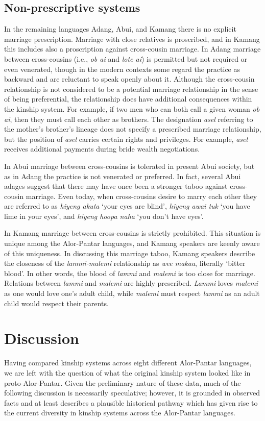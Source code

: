 \subsection{Non-prescriptive systems}
In the remaining languages Adang, Abui, and Kamang there is no explicit marriage prescription. Marriage with close relatives is proscribed, and in Kamang this includes also a proscription against cross-cousin marriage. In Adang marriage between cross-cousins (i.e., \textit{ob ai} and \textit{lote ai}) is permitted but not required or even venerated, though in the modern contexts some regard the practice as backward and are reluctant to speak openly about it. Although the cross-cousin relationship is not considered to be a potential marriage relationship in the sense of being preferential, the relationship does have additional consequences within the kinship system. For example, if two men who can both call a given woman \textit{ob ai}, then they must call each other as brothers. The designation \textit{asel} referring to the mother's brother's lineage does not specify a prescribed marriage relationship, but the position of \textit{asel} carries certain rights and privileges. For example, \textit{asel} receives additional payments during bride wealth negotiations.

In Abui marriage between cross-cousins is tolerated in present Abui society, but as in Adang the practice is not venerated or preferred. In fact, several Abui adages suggest that there may have once been a stronger taboo against cross-cousin marriage. Even today, when cross-cousins desire to marry each other they are referred to as \textit{hiyeng akuta} `your eyes are blind', \textit{hiyeng awai tuk} `you have lime in your eyes', and \textit{hiyeng hoopa naha} `you don't have eyes'.

In Kamang marriage between cross-cousins is strictly prohibited. This situation is unique among the Alor-Pantar languages, and Kamang speakers are keenly aware of this uniqueness. In discussing this marriage taboo, Kamang speakers describe the closeness of the \textit{lammi-malemi} relationship as \textit{wee makaa}, literally `bitter blood'. In other words, the blood of \textit{lammi} and \textit{malemi} is too close for marriage. Relations between \textit{lammi} and \textit{malemi} are highly prescribed. \textit{Lammi} loves \textit{malemi} as one would love one's adult child, while \textit{malemi} must respect \textit{lammi} as an adult child would respect their parents.

\section{Discussion}
Having compared kinship systems across eight different Alor-Pantar languages, we are left with the question of what the original kinship system looked like in proto-Alor-Pantar. Given the preliminary nature of these data, much of the following discussion is necessarily speculative; however, it is grounded in observed facts and at least describes a plausible historical pathway which has given rise to the current diversity in kinship systems across the Alor-Pantar languages.

